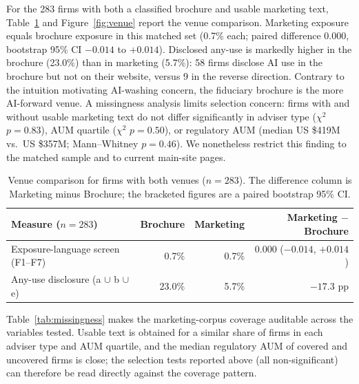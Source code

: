 \documentclass[utf8]{FrontiersinHarvard} %
\begin{document}
For the 283 firms with both a classified brochure and usable marketing text, Table~\ref{tab:venue} and Figure~\ref{fig:venue} report the venue comparison. Marketing exposure equals brochure exposure in this matched set (0.7\% each; paired difference 0.000, bootstrap 95\% CI $-0.014$ to $+0.014$). Disclosed any-use is markedly higher in the brochure (23.0\%) than in marketing (5.7\%): 58 firms disclose AI use in the brochure but not on their website, versus 9 in the reverse direction. Contrary to the intuition motivating AI-washing concern, the fiduciary brochure is the more AI-forward venue. A missingness analysis limits selection concern: firms with and without usable marketing text do not differ significantly in adviser type ($\chi^2$ $p = 0.83$), AUM quartile ($\chi^2$ $p = 0.50$), or regulatory AUM (median US \$419M vs.\ US \$357M; Mann--Whitney $p = 0.46$). We nonetheless restrict this finding to the matched sample and to current main-site pages.

\begin{table}[!ht]
\caption{Venue comparison for firms with both venues ($n = 283$). The difference column is Marketing minus Brochure; the bracketed figures are a paired bootstrap 95\% CI.}
\label{tab:venue}
\centering
\begin{tabular}{lrrr}
\toprule
Measure ($n = 283$) & Brochure & Marketing & Marketing $-$ Brochure \\
\midrule
Exposure-language screen (F1--F7) & 0.7\% & 0.7\% & 0.000 ($-0.014$, $+0.014$) \\
Any-use disclosure (a $\cup$ b $\cup$ e) & 23.0\% & 5.7\% & $-17.3$ pp \\
\bottomrule
\end{tabular}
\end{table}

Table~\ref{tab:missingness} makes the marketing-corpus coverage auditable across the variables tested. Usable text is obtained for a similar share of firms in each adviser type and AUM quartile, and the median regulatory AUM of covered and uncovered firms is close; the selection tests reported above (all non-significant) can therefore be read directly against the coverage pattern.
\end{document}
